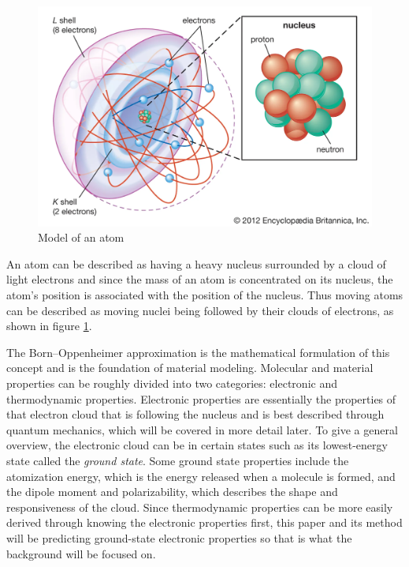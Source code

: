 \documentclass[12pt, abstract = true]{scrartcl}
\begin{document}
\begin{figure}
  \centering
  \includegraphics[scale=.20]{atom.png}
  
  \caption{Model of an atom}\label{fig:atom}
\end{figure}

An atom can be described as having a heavy nucleus surrounded by a cloud of light 
electrons and since the mass of an atom is concentrated on its nucleus, the atom's 
position is associated with the position of the nucleus. Thus moving atoms can be described
as moving nuclei being followed by their clouds of electrons, as shown in figure \ref{fig:atom}. 



The Born–Oppenheimer approximation is the mathematical formulation of this concept and 
is the foundation of material modeling. Molecular and material properties can be 
roughly divided into two categories: electronic and thermodynamic properties. Electronic 
properties are essentially the properties of that electron cloud that is following the 
nucleus and is best described through quantum mechanics, which will be covered in more 
detail later. To give a general overview, the electronic cloud can be in certain states 
such as its lowest-energy state called the \emph{ground state}. Some ground state properties include the atomization energy, which is the energy released when a molecule is formed, and the 
dipole moment and polarizability, which describes the shape and responsiveness of the
cloud. Since thermodynamic properties can be more easily derived through knowing the electronic 
properties first, this paper and its method will be predicting ground-state electronic properties 
so that is what the background will be focused on. 
\end{document}
